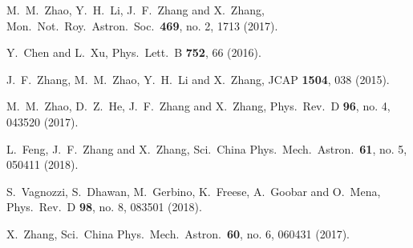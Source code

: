 \documentclass[aps,prd,nofootinbib,amsmath,amssymb,twocolumn,superscriptaddress,10pt]{revtex4}%
\begin{document}
\begin{thebibliography}{}
  M.~M.~Zhao, Y.~H.~Li, J.~F.~Zhang and X.~Zhang,
  Mon.\ Not.\ Roy.\ Astron.\ Soc.\  {\bf 469}, no. 2, 1713 (2017).

  Y.~Chen and L.~Xu,
  Phys.\ Lett.\ B {\bf 752}, 66 (2016).

  J.~F.~Zhang, M.~M.~Zhao, Y.~H.~Li and X.~Zhang,
  JCAP {\bf 1504}, 038 (2015).

  M.~M.~Zhao, D.~Z.~He, J.~F.~Zhang and X.~Zhang,
  Phys.\ Rev.\ D {\bf 96}, no. 4, 043520 (2017).

  L.~Feng, J.~F.~Zhang and X.~Zhang,
  Sci.\ China Phys.\ Mech.\ Astron.\  {\bf 61}, no. 5, 050411 (2018).


  S.~Vagnozzi, S.~Dhawan, M.~Gerbino, K.~Freese, A.~Goobar and O.~Mena,
  Phys.\ Rev.\ D {\bf 98}, no. 8, 083501 (2018).

  X.~Zhang,
  Sci.\ China Phys.\ Mech.\ Astron.\  {\bf 60}, no. 6, 060431 (2017).


\end{thebibliography}
\end{document}
